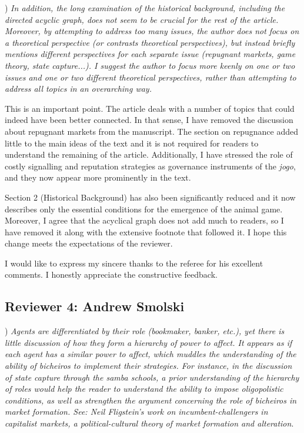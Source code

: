 \documentclass[a4paper,12pt]{article}
\begin{document}
) \textit{In addition, the long examination of the historical background, including the directed acyclic graph, does not seem to be crucial for the rest of the article. Moreover, by attempting to address too many issues, the author does not focus on a theoretical perspective (or contrasts theoretical perspectives), but instead briefly mentions different perspectives for each separate issue (repugnant markets, game theory, state capture...). I suggest the author to focus more keenly on one or two issues and one or two different theoretical perspectives, rather than attempting to address all topics in an overarching way.}

\vspace{.25cm}

This is an important point. The article deals with a number of topics that could indeed have been better connected. In that sense, I have removed the discussion about repugnant markets from the manuscript. The section on repugnance added little to the main ideas of the text and it is not required for readers to understand the remaining of the article. Additionally, I have stressed the role of costly signalling and reputation strategies as governance instruments of the \textit{jogo}, and they now appear more prominently in the text.  

Section 2 (Historical Background) has also been significantly reduced and it now describes only the essential conditions for the emergence of the animal game. Moreover, I agree that the acyclical graph does not add much to readers, so I have removed it along with the extensive footnote that followed it. I hope this change meets the expectations of the reviewer.  

\vspace{.5cm}

I would like to express my sincere thanks to the referee for his excellent comments. I honestly appreciate the constructive feedback.

\newpage

\subsection*{Reviewer 4: Andrew Smolski}%
\label{sub:reviewer_4_andrew_smolski}

) \textit{Agents are differentiated by their role (bookmaker, banker, etc.), yet there is little discussion of how they form a hierarchy of power to affect. It appears as if each agent has a similar power to affect, which muddles the understanding of the ability of bicheiros to implement their strategies. For instance, in the discussion of state capture through the samba schools, a prior understanding of the hierarchy of roles would help the reader to understand the ability to impose oligopolistic conditions, as well as strengthen the argument concerning the role of bicheiros in market formation. See: Neil Fligstein's work on incumbent-challengers in capitalist markets, a political-cultural theory of market formation and alteration}. 
\end{document}
